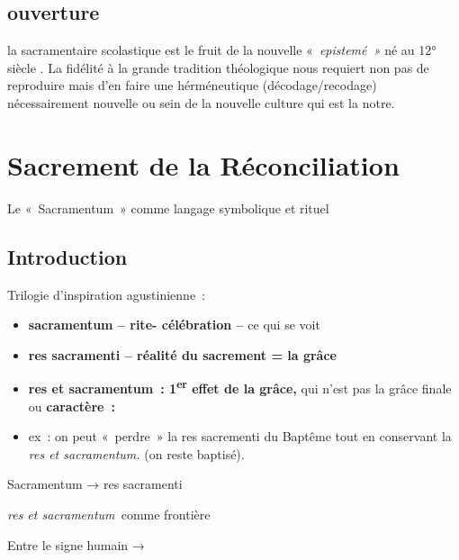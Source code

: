 \hypertarget{ouverture}{%
\section{ouverture}\label{ouverture}}

la sacramentaire scolastique est le fruit de la nouvelle
«~\emph{epistemé~»} né au 12° siècle . La fidélité à la grande tradition
théologique nous requiert non pas de reproduire mais d'en faire une
hérméneutique (décodage/recodage) nécessairement nouvelle ou sein de la
nouvelle culture qui est la notre.

 
\chapter{Sacrement de la Réconciliation}


Le «~Sacramentum~» comme langage symbolique et rituel

\hypertarget{introduction}{%
\section{Introduction}\label{introduction}}

Trilogie d'inspiration agustinienne~:

\begin{itemize}
\item
  \textbf{sacramentum -- rite- célébration --} ce qui se voit
\item
  \textbf{res sacramenti -- réalité du sacrement = la grâce}
\item
  \textbf{res et sacramentum~: 1\textsuperscript{er} effet de la grâce,}
  qui n'est pas la grâce finale ou \textbf{caractère~:}
\item
   
  ex~: on peut «~perdre~» la res sacrementi du Baptême tout en
  conservant la \emph{res et sacramentum.} (on reste baptisé).
   
\end{itemize}

Sacramentum → res sacramenti

\emph{res et sacramentum~}comme frontière

Entre le signe humain →

